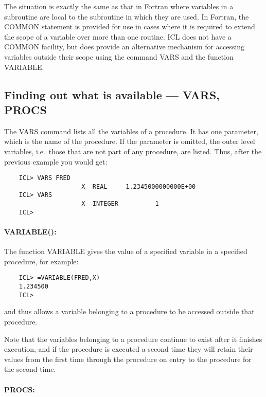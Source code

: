 The situation is exactly the same as that in Fortran where variables in a
subroutine are local to the subroutine in which they are used.
In Fortran, the COMMON statement is provided for use in cases where it is
required to extend the scope of a variable over more than one routine.
ICL does not have a COMMON facility, but does provide an alternative mechanism
for accessing variables outside their scope using the command VARS and the
function VARIABLE.

\subsection{Finding out what is available --- VARS, PROCS}

The VARS command lists all the variables of a procedure.
It has one parameter, which is the name of the procedure.
If the parameter is omitted, the outer level variables, i.e.\ those that are
not part of any procedure, are listed.
Thus, after the previous example you would get:

\begin{small}
\begin{verbatim}
    ICL> VARS FRED
                     X  REAL     1.2345000000000E+00
    ICL> VARS
                     X  INTEGER          1
    ICL>
\end{verbatim}
\end{small}

\paragraph{VARIABLE():}\hfill

The function VARIABLE gives the value of a specified variable in a specified
procedure, for example:

\begin{small}
\begin{verbatim}
    ICL> =VARIABLE(FRED,X)
    1.234500
    ICL>
\end{verbatim}
\end{small}

and thus allows a variable belonging to a procedure to be accessed outside
that procedure.

Note that the variables belonging to a procedure continue to exist after it
finishes execution, and if the procedure is executed a second time they will
retain their values from the first time through the procedure on entry to the
procedure for the second time.

\paragraph{PROCS:}\hfill

